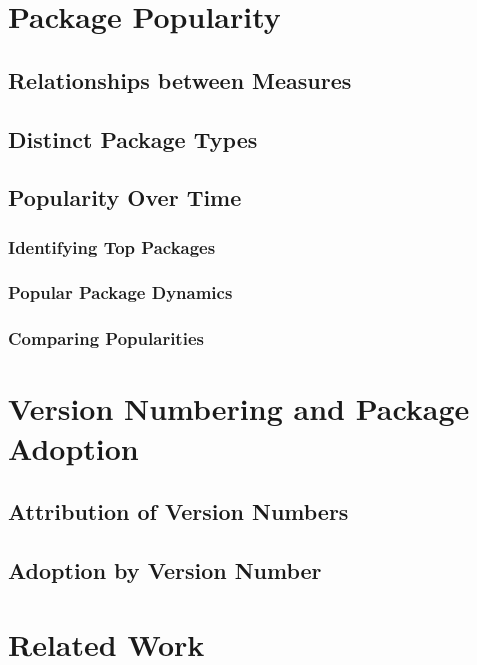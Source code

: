\documentclass[10pt,conference]{IEEEtran}
\begin{document}
\section{Package Popularity}

\subsection{Relationships between Measures}

\subsection{Distinct Package Types}

\subsection{Popularity Over Time}

\subsubsection{Identifying Top Packages}

\subsubsection{Popular Package Dynamics}

\subsubsection{Comparing Popularities}

\section{Version Numbering and Package Adoption}

\subsection{Attribution of Version Numbers}

\subsection{Adoption by Version Number}

\section{Related Work}
\end{document}
